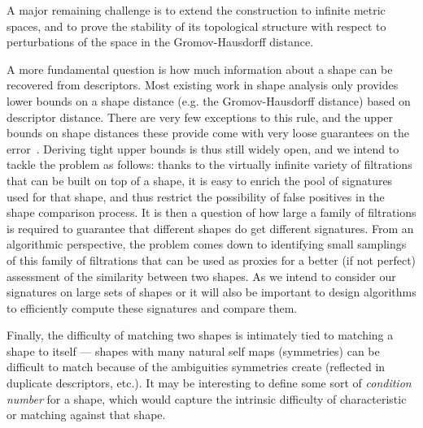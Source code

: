 A major remaining challenge is to extend the
construction to infinite metric spaces, and to prove the stability of
its topological structure with respect to perturbations of the space
in the Gromov-Hausdorff distance.

A more fundamental question is how much information about a shape can
be recovered from descriptors. Most existing work in shape analysis
only provides lower bounds on a shape distance (e.g. the
Gromov-Hausdorff distance) based on descriptor distance. There are
very few exceptions to this rule, and the upper bounds on shape
distances these provide come with very loose guarantees on the
error~\cite{bbk-gmds-06,ms-gh-05}. Deriving tight upper bounds is
thus still widely open, and we intend to tackle the problem as
follows: thanks to the virtually infinite variety of filtrations that
can be built on top of a shape, it is easy to enrich the pool of
signatures used for that shape, and thus restrict the possibility of
false positives in the shape comparison process. It is then a question
of how large a family of filtrations is required to guarantee that
different shapes do get different signatures. From an algorithmic
perspective, the problem comes down to identifying small samplings of this
family of filtrations that can be used as proxies for a better (if not
perfect) assessment of the similarity between two shapes.  As we
intend to consider our signatures on large sets of shapes or it will
also be important to design algorithms to efficiently compute these
signatures and compare them. 

Finally, the difficulty of matching two shapes is
intimately tied to matching a shape to itself --- shapes with many
natural self maps (symmetries) can be difficult to match because of
the ambiguities symmetries create (reflected in duplicate descriptors,
etc.). It may be interesting to define some sort of {\em condition
  number} for a shape, which would capture the intrinsic difficulty of
characteristic or matching against that shape.



